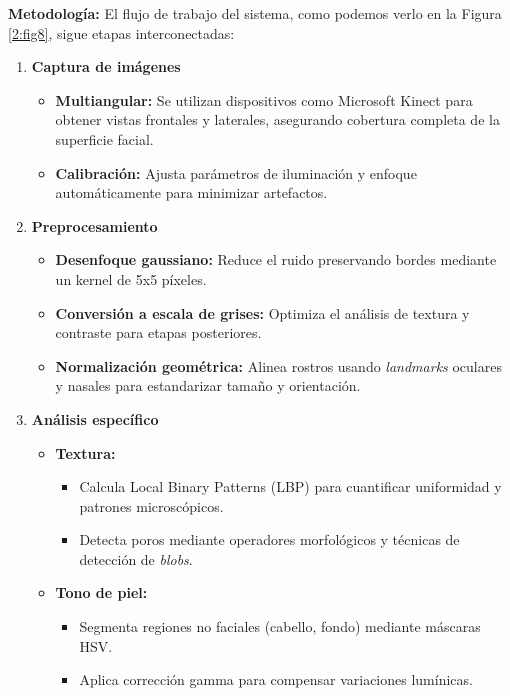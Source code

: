 \textbf{Metodología:}
El flujo de trabajo del sistema, como podemos verlo en la Figura \ref{2:fig8}, sigue etapas interconectadas:

\begin{enumerate}
    \item \textbf{Captura de imágenes}
    \begin{itemize}
        \item \textbf{Multiangular:} Se utilizan dispositivos como Microsoft Kinect para obtener vistas frontales y laterales, asegurando cobertura completa de la superficie facial.
        \item \textbf{Calibración:} Ajusta parámetros de iluminación y enfoque automáticamente para minimizar artefactos.
    \end{itemize}

    \item \textbf{Preprocesamiento}
    \begin{itemize}
        \item \textbf{Desenfoque gaussiano:} Reduce el ruido preservando bordes mediante un kernel de 5x5 píxeles.
        \item \textbf{Conversión a escala de grises:} Optimiza el análisis de textura y contraste para etapas posteriores.
        \item \textbf{Normalización geométrica:} Alinea rostros usando \textit{landmarks} oculares y nasales para estandarizar tamaño y orientación.
    \end{itemize}

    \item \textbf{Análisis específico}
    \begin{itemize}
        \item \textbf{Textura:}
        \begin{itemize}
            \item Calcula Local Binary Patterns (LBP) para cuantificar uniformidad y patrones microscópicos.
            \item Detecta poros mediante operadores morfológicos y técnicas de detección de \textit{blobs}.
        \end{itemize}
        
        \item \textbf{Tono de piel:}
        \begin{itemize}
            \item Segmenta regiones no faciales (cabello, fondo) mediante máscaras HSV.
            \item Aplica corrección gamma para compensar variaciones lumínicas.
        \end{itemize}
        

\end{itemize}
\end{enumerate}
